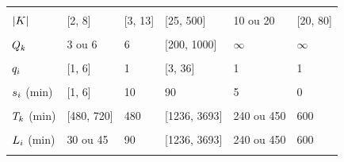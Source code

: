 \begin{table}[]
\begin{tabular}{llllll}
\\ & & & & & \\
\multirow{\numberOfRows}{\firstColumnWidth}{$|K|$}  &
  \multirow{\numberOfRows}{\columnWidth}{[2, 8]} & 
  \multirow{\numberOfRows}{\columnWidth}{[3, 13]} & 
  \multirow{\numberOfRows}{\columnWidth}{[25, 500]} & 
  \multirow{\numberOfRows}{\columnWidth}{10 ou 20} & 
  \multirow{\numberOfRows}{\columnWidth}{[20, 80]}
\\ & & & & & \\
\multirow{\numberOfRows}{\firstColumnWidth}{$Q_{k}$}  &  
  \multirow{\numberOfRows}{\columnWidth}{3 ou 6 } & 
  \multirow{\numberOfRows}{\columnWidth}{6} & 
  \multirow{\numberOfRows}{\columnWidth}{[200, 1000]} & 
  \multirow{\numberOfRows}{\columnWidth}{$\infty$} & 
  \multirow{\numberOfRows}{\columnWidth}{$\infty$}
\\ & & & & & \\
  \multirow{\numberOfRows}{\firstColumnWidth}{$q_{i}$} &
  \multirow{\numberOfRows}{\columnWidth}{[1, 6]} & 
  \multirow{\numberOfRows}{\columnWidth}{1} & 
  \multirow{\numberOfRows}{\columnWidth}{[3, 36]} & 
  \multirow{\numberOfRows}{\columnWidth}{1} & 
  \multirow{\numberOfRows}{\columnWidth}{1}
\\ & & & & & \\
\multirow{\numberOfRows}{\firstColumnWidth}{$s_i$ (min)} & 
  \multirow{\numberOfRows}{\columnWidth}{[1, 6]} & 
  \multirow{\numberOfRows}{\columnWidth}{10} & 
  \multirow{\numberOfRows}{\columnWidth}{90} & 
  \multirow{\numberOfRows}{\columnWidth}{5} & 
  \multirow{\numberOfRows}{\columnWidth}{0}
\\ & & & & & \\
\multirow{\numberOfRows}{\firstColumnWidth}{$T_k$  (min)}  &
  \multirow{\numberOfRows}{\columnWidth}{[480, 720]} & 
  \multirow{\numberOfRows}{\columnWidth}{480} & 
  \multirow{\numberOfRows}{\columnWidth}{[1236, 3693]} & 
  \multirow{\numberOfRows}{\columnWidth}{240 ou 450} & 
  \multirow{\numberOfRows}{\columnWidth}{600}
\\ & & & & & \\
\multirow{\numberOfRows}{\firstColumnWidth}{$L_i$ (min)}  &
  \multirow{\numberOfRows}{\columnWidth}{30 ou 45} & 
  \multirow{\numberOfRows}{\columnWidth}{90} & 
  \multirow{\numberOfRows}{\columnWidth}{[1236, 3693]} & 
  \multirow{\numberOfRows}{\columnWidth}{240 ou 450} & 
  \multirow{\numberOfRows}{\columnWidth}{600}
\\ & & & & & \\
\bottomrule
\end{tabular}
\end{table}





